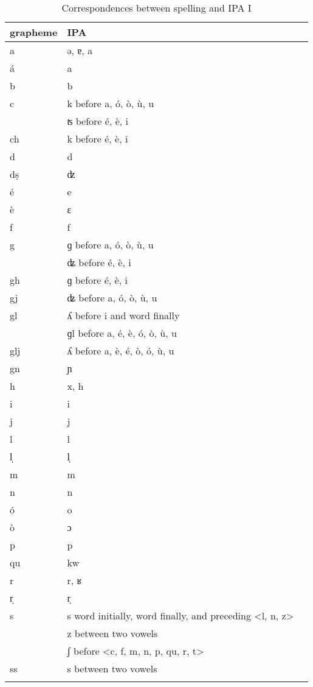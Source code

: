 {\begin{table}
\caption{Correspondences between spelling and IPA I}
\label{graphIpaI} 
\begin{tabular}{lll}
    \lsptoprule
        grapheme      & IPA\\
    \midrule  
  a & ə, ɐ, a\\
  á & a\\
  b & b\\
  c & k before a, ó, ò, ù, u\\
  & ʦ before é, è, i\\
  ch & k before é, è, i\\
  d & d\\
  dṣ & ʣ\\
  é & e\\
  è & ɛ\\
  f & f\\
  g & ɡ before a, ó, ò, ù, u\\
  & ʥ before é, è, i\\
  gh & ɡ before é, è, i\\
  gj & ʥ before a, ó, ò, ù, u\\
  gl & ʎ before i and word finally\\
  & ɡl before a, é, è, ó, ò, ù, u\\
  glj & ʎ before a, è, é, ò, ó, ù, u\\
  gn& ɲ\\
  h & x, h\\
  i & i\\
  j & j\\
  l & l\\
  l̩ & l̩\\
  m & m\\
  n & n\\
  ó & o\\
  ò & ɔ\\
  p & p\\
  qu & kw\\
  r & r, ʁ\\
  r̩ & r̩\\
  s & s word initially, word finally, and preceding <l, n, z>\\
  & z between two vowels\\
  & ʃ before <c, f, m, n, p, qu, r, t>\\
  ss & s between two vowels\\
  
  \lspbottomrule
\end{tabular} 
\end{table}


}
